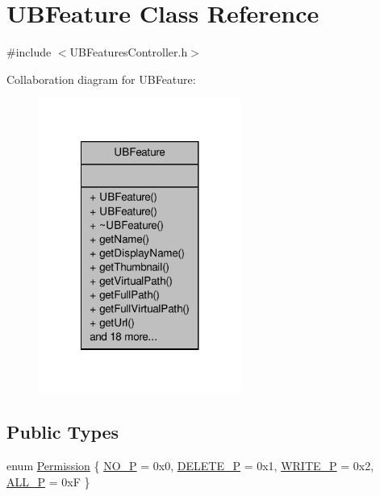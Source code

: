 \hypertarget{class_u_b_feature}{\section{U\-B\-Feature Class Reference}
\label{db/d98/class_u_b_feature}
}


{\ttfamily \#include $<$U\-B\-Features\-Controller.\-h$>$}



Collaboration diagram for U\-B\-Feature\-:
\nopagebreak
\begin{figure}[H]
\begin{center}
\leavevmode
\includegraphics[width=188pt]{da/d23/class_u_b_feature__coll__graph}
\end{center}
\end{figure}
\subsection*{Public Types}
\begin{DoxyCompactItemize}
\item 
enum \hyperlink{class_u_b_feature_a7fb84a230f92260b4a29261329ad4180}{Permission} \{ \hyperlink{class_u_b_feature_a7fb84a230f92260b4a29261329ad4180afa2f16afae4c42a6ef5a06526e349580}{N\-O\-\_\-\-P} =  0x0, 
\hyperlink{class_u_b_feature_a7fb84a230f92260b4a29261329ad4180ab79f2690a1b89f195cb53d7b12c80ee4}{D\-E\-L\-E\-T\-E\-\_\-\-P} =  0x1, 
\hyperlink{class_u_b_feature_a7fb84a230f92260b4a29261329ad4180ab9f45fdbdf71b8829ec8d9aff2e445af}{W\-R\-I\-T\-E\-\_\-\-P} =  0x2, 
\hyperlink{class_u_b_feature_a7fb84a230f92260b4a29261329ad4180ac5b053fe5b2b8f899db8524645ee8fa7}{A\-L\-L\-\_\-\-P} =  0x\-F
 \}
\end{DoxyCompactItemize}
